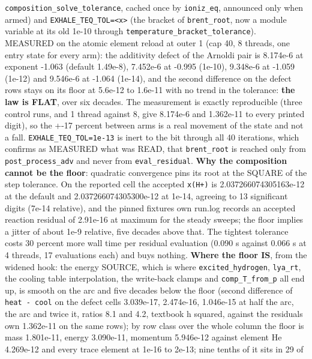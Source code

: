 \documentclass[english,a4paper]{my_memo}
\begin{document}
\begin{itemize}
  \texttt{composition\_solve\_tolerance}, cached once by \texttt{ioniz\_eq}, announced only
  when armed) and \texttt{EXHALE\_TEQ\_TOL=\textless{}x\textgreater{}} (the bracket of \texttt{brent\_root}, now a
  module variable at its old 1e-10 through
  \texttt{temperature\_bracket\_tolerance}). MEASURED on the atomic element reload
  at outer 1 (cap 40, 8 threads, one entry state for every arm): the
  additivity defect of the Arnoldi pair is 8.174e-6 at exponent -1.063
  (default 1.49e-8), 7.452e-6 at -0.995 (1e-10), 9.348e-6 at -1.059
  (1e-12) and 9.546e-6 at -1.064 (1e-14), and the second difference on the
  defect rows stays on its floor at 5.6e-12 to 1.6e-11 with no trend in
  the tolerance: \textbf{the law is FLAT}, over six decades. The measurement is
  exactly reproducible (three control runs, and 1 thread against 8, give
  8.174e-6 and 1.362e-11 to every printed digit), so the +-17 percent
  between arms is a real movement of the state and not a fall.
  \texttt{EXHALE\_TEQ\_TOL=1e-13} is inert to the bit through all 40 iterations,
  which confirms as MEASURED what was READ, that \texttt{brent\_root} is reached
  only from \texttt{post\_process\_adv} and never from \texttt{eval\_residual}. \textbf{Why the
  composition cannot be the floor}: quadratic convergence pins its root
  at the SQUARE of the step tolerance. On the reported cell the accepted
  \texttt{x(H+)} is 2.037266074305163e-12 at the default and
  2.037266074305300e-12 at 1e-14, agreeing to 13 significant digits (7e-14
  relative), and the pinned fixture\textquotesingle s own run.log records an accepted
  reaction residual of 2.91e-16 at maximum for the steady sweeps; the
  floor implies a jitter of about 1e-9 relative, five decades above that.
  The tightest tolerance costs 30 percent more wall time per residual
  evaluation (0.090 s against 0.066 s at 4 threads, 17 evaluations each)
  and buys nothing. \textbf{Where the floor IS}, from the widened hook: the
  energy SOURCE, which is where \texttt{excited\_hydrogen}, \texttt{lya\_rt}, the cooling
  table interpolation, the write-back clamps and \texttt{comp\_T\_from\_p} all end
  up, is smooth on the arc and five decades below the floor (second
  difference of \texttt{heat\ -\ cool} on the defect cells 3.039e-17, 2.474e-16,
  1.046e-15 at half the arc, the arc and twice it, ratios 8.1 and 4.2,
  textbook h squared, against the residual\textquotesingle s own 1.362e-11 on the same
  rows); by row class over the whole column the floor is mass 1.801e-11,
  energy 3.090e-11, momentum 5.946e-12 against element He 4.269e-12 and
  every trace element at 1e-16 to 2e-13; nine tenths of it sits in 29 of

\end{itemize}
\end{document}
